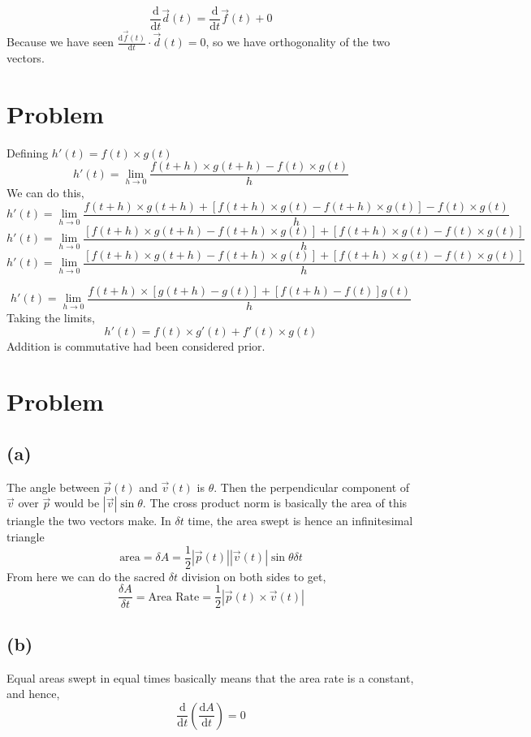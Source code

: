 \documentclass[letter]{article}
\begin{document}
\[
	\frac{\mathrm{d} }{\mathrm{d} t} \vec{d}(t) = \frac{\mathrm{d} }{\mathrm{d} t} \vec{f}(t) + 0
\]
Because we have seen $\frac{\mathrm{d} \vec{f}(t)}{\mathrm{d} t} \cdot  \vec{d}(t) = 0$, so we have orthogonality of the two vectors.

\section{Problem} 
Defining $h'(t) = f(t) \times g(t)$
\[
h'(t) = \lim_{h \to 0} \frac{f(t+h)\times g(t+h) - f(t) \times g(t)}{h}
\]
We can do this, 
\[
	h'(t) = \lim_{h \to 0} \frac{f(t+h)\times g(t+h) +[f(t+h) \times g(t) - f(t+h) \times g(t)]- f(t) \times g(t)}{h}
\]
\[
	h'(t) = \lim_{h \to 0} \frac{[f(t+h)\times g(t+h) - f(t+h) \times g(t) ] + [f(t+h) \times g(t)- f(t) \times g(t)]}{h}
\]
\[
	h'(t) = \lim_{h \to 0} \frac{[f(t+h)\times g(t+h) - f(t+h) \times g(t) ]  +[f(t+h) \times g(t)- f(t) \times g(t)]}{h}
\]

\[
	h'(t) = \lim_{h \to 0} \frac{f(t+h)\times [g(t+h) -   g(t) ]  +[f(t+h) -f(t) ] g(t)}{h}
\]
Taking the limits, 
\[
h'(t) = f(t) \times g'(t) + f'(t) \times g(t)
\]
Addition is commutative had been considered prior. 

\section{Problem}
\subsection*{(a)}
The angle between $\vec{p}(t)$ and $\vec{v}(t)$ is $\theta$. Then the perpendicular component of $\vec{v}$ over $\vec{p}$ would be $ |\vec{v}| \sin \theta$. The cross product norm is basically the area of this triangle the two vectors make. In $\delta t$ time, the area swept is hence an infinitesimal triangle
\[
\text{area} = \delta A = \frac{1}{2} |\vec{p}(t)| |\vec{v}(t)| \sin \theta \delta t
\]
From here we can do the sacred $\delta t$ division on both sides to get, 
\[
\frac{\delta A}{\delta t} = \text{Area Rate} = \frac{1}{2} | \vec{p}(t) \times \vec{v}(t)|
\] 

\subsection*{(b)} 
Equal areas swept in equal times basically means that the area rate is a constant, and hence, 
\[
	\frac{\mathrm{d} }{\mathrm{d} t}\left( \frac{\mathrm{d} A}{\mathrm{d} t}\right) = 0
\] 
\end{document}
